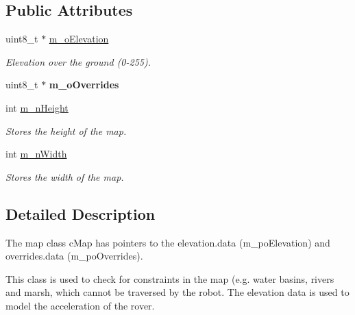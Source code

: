 \subsection*{Public Attributes}
\begin{DoxyCompactItemize}
\item 
\mbox{\label{classplanner_1_1c_graph_a3138f12f0f4922c293af3f374ebd3e9e}} 
uint8\+\_\+t $\ast$ \mbox{\hyperlink{classplanner_1_1c_graph_a3138f12f0f4922c293af3f374ebd3e9e}{m\+\_\+o\+Elevation}}
\begin{DoxyCompactList}\small\item\em Elevation over the ground (0-\/255). \end{DoxyCompactList}\item 
\mbox{\label{classplanner_1_1c_graph_a48c342e3a45af78d52a6e6e5d5f3baf2}} 
uint8\+\_\+t $\ast$ {\bfseries m\+\_\+o\+Overrides}
\item 
\mbox{\label{classplanner_1_1c_graph_a5bb5ea1aa1709b4530bbf5f931c1f277}} 
int \mbox{\hyperlink{classplanner_1_1c_graph_a5bb5ea1aa1709b4530bbf5f931c1f277}{m\+\_\+n\+Height}}
\begin{DoxyCompactList}\small\item\em Stores the height of the map. \end{DoxyCompactList}\item 
\mbox{\label{classplanner_1_1c_graph_a91f89c2fde0344dc74060297b2d5235e}} 
int \mbox{\hyperlink{classplanner_1_1c_graph_a91f89c2fde0344dc74060297b2d5235e}{m\+\_\+n\+Width}}
\begin{DoxyCompactList}\small\item\em Stores the width of the map. \end{DoxyCompactList}\end{DoxyCompactItemize}


\subsection{Detailed Description}
The map class c\+Map has pointers to the elevation.\+data (m\+\_\+po\+Elevation) and overrides.\+data (m\+\_\+po\+Overrides). 

This class is used to check for constraints in the map (e.\+g. water basins, rivers and marsh, which cannot be traversed by the robot. The elevation data is used to model the acceleration of the rover. 

